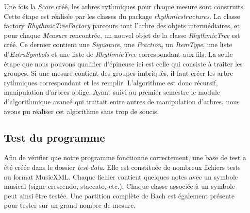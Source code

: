 Une fois la \emph{Score} créé, les arbres rythmiques pour chaque mesure sont construits. Cette étape est réalisée par les classes du package \emph{rhythmicstructures}. La classe factory \emph{RhythmicTreeFactory} parcours tout l'arbre des objets intermédiaires, et pour chaque \emph{Measure} rencontrée, un nouvel objet de la classe \emph{RhythmicTree} est créé. Ce dernier contient une \emph{Signature}, une \emph{Fraction}, un \emph{ItemType}, une liste d'\emph{ExtraSymbols} et une liste de \emph{RhythmicTree} correspondant aux fils. La seule étape que nous pouvons qualifier d'épineuse ici est celle qui consiste à traiter les groupes. Si une mesure contient des groupes imbriqués, il faut créer les arbre rythmiques correspondant et les remplir. L'algorithme est donc récursif, manipulation d'arbres oblige. Ayant suivi au premier semestre le module d'algorithmique avancé qui traitait entre autres de manipulation d'arbres, nous avons pu réaliser cet algorithme sans trop de soucis.


\subsection{Test du programme}

Afin de vérifier que notre programme fonctionne correctement, une base de test a été créée dans le dossier \emph{test-data}. Elle est constituée de nombreux fichiers tests au format MusicXML. Chaque fichier contient quelques notes avec un symbole musical (signe crescendo, staccato, etc.). Chaque classe associée à un symbole peut ainsi être testée. Une partition complète de Bach est également présente pour tester sur un grand nombre de mesure.
